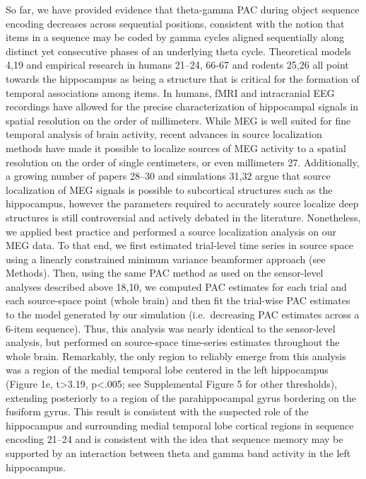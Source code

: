 So far, we have provided evidence that theta-gamma PAC during object
sequence encoding decreases across sequential positions, consistent with
the notion that items in a sequence may be coded by gamma cycles aligned
sequentially along distinct yet consecutive phases of an underlying
theta cycle. Theoretical models 4,19 and empirical research in humans
21--24, 66-67 and rodents 25,26 all point towards the hippocampus as
being a structure that is critical for the formation of temporal
associations among items. In humans, fMRI and intracranial EEG
recordings have allowed for the precise characterization of hippocampal
signals in spatial resolution on the order of millimeters. While MEG is
well suited for fine temporal analysis of brain activity, recent
advances in source localization methods have made it possible to
localize sources of MEG activity to a spatial resolution on the order of
single centimeters, or even millimeters 27. Additionally, a growing
number of papers 28--30 and simulations 31,32 argue that source
localization of MEG signals is possible to subcortical structures such
as the hippocampus, however the parameters required to accurately source
localize deep structures is still controversial and actively debated in
the literature. Nonetheless, we applied best practice and performed a
source localization analysis on our MEG data. To that end, we first
estimated trial-level time series in source space using a linearly
constrained minimum variance beamformer approach (see Methods). Then,
using the same PAC method as used on the sensor-level analyses described
above 18,10, we computed PAC estimates for each trial and each
source-space point (whole brain) and then fit the trial-wise PAC
estimates to the model generated by our simulation (i.e.~decreasing PAC
estimates across a 6-item sequence). Thus, this analysis was nearly
identical to the sensor-level analysis, but performed on source-space
time-series estimates throughout the whole brain. Remarkably, the only
region to reliably emerge from this analysis was a region of the medial
temporal lobe centered in the left hippocampus (Figure 1e,
t\textgreater{}3.19, p\textless{}.005; see Supplemental Figure 5 for
other thresholds), extending posteriorly to a region of the
parahippocampal gyrus bordering on the fusiform gyrus. This result is
consistent with the suspected role of the hippocampus and surrounding
medial temporal lobe cortical regions in sequence encoding 21--24 and is
consistent with the idea that sequence memory may be supported by an
interaction between theta and gamma band activity in the left
hippocampus.

